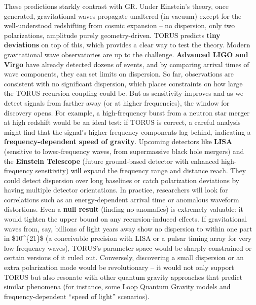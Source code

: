 \documentclass[
]{article}
\begin{document}
These predictions starkly contrast with GR. Under Einstein's theory,
once generated, gravitational waves propagate unaltered (in vacuum)
except for the well-understood redshifting from cosmic expansion -- no
dispersion, only two polarizations, amplitude purely geometry-driven.
TORUS predicts \textbf{tiny deviations} on top of this, which provides a
clear way to test the theory. Modern gravitational wave observatories
are up to the challenge. \textbf{Advanced LIGO and Virgo} have already
detected dozens of events, and by comparing arrival times of wave
components, they can set limits on dispersion. So far, observations are
consistent with no significant dispersion, which places constraints on
how large the TORUS recursion coupling could be. But as sensitivity
improves and as we detect signals from farther away (or at higher
frequencies), the window for discovery opens. For example, a
high-frequency burst from a neutron star merger at high redshift would
be an ideal test: if TORUS is correct, a careful analysis might find
that the signal's higher-frequency components lag behind, indicating a
\textbf{frequency-dependent speed of gravity}\hspace{0pt}. Upcoming
detectors like \textbf{LISA} (sensitive to lower-frequency waves, from
supermassive black hole mergers) and the \textbf{Einstein Telescope}
(future ground-based detector with enhanced high-frequency sensitivity)
will expand the frequency range and distance reach. They could detect
dispersion over long baselines or catch polarization deviations by
having multiple detector orientations. In practice, researchers will
look for correlations such as an energy-dependent arrival time or
anomalous waveform distortions. Even a \textbf{null result} (finding no
anomalies) is extremely valuable: it would tighten the upper bound on
any recursion-induced effects. If gravitational waves from, say,
billions of light years away show no dispersion to within one part in
\$10\^{}\{21\}\$ (a conceivable precision with LISA or a pulsar timing
array for very low-frequency waves), TORUS's parameter space would be
sharply constrained or certain versions of it ruled out\hspace{0pt}.
Conversely, discovering a small dispersion or an extra polarization mode
would be revolutionary -- it would not only support TORUS but also
resonate with other quantum gravity approaches that predict similar
phenomena (for instance, some Loop Quantum Gravity models and
frequency-dependent ``speed of light'' scenarios)\hspace{0pt}.
\end{document}

